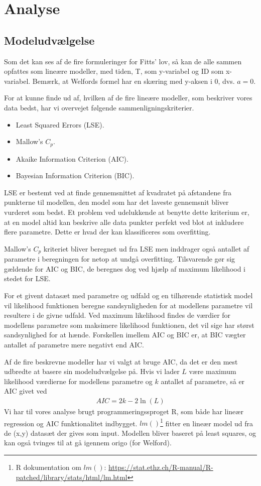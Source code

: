 \newpage
{}
\chapter*{Analyse}
\section*{Modeludvælgelse}
Som det kan ses af de fire formuleringer for Fitts' lov, så kan de alle sammen opfattes som lineære modeller, med tiden, T, som y-variabel og ID som x-variabel. Bemærk, at Welfords formel har en skæring med y-aksen i 0, dvs. $a=0$. 

For at kunne finde ud af, hvilken af de fire lineære modeller, som beskriver vores data bedst, har vi overvejet følgende sammenligningskriterier.

\begin{itemize}
\item{Least Squared Errors (LSE).}
\item{Mallow's $C_p$.}
\item{Akaike Information Criterion (AIC).}
\item{Bayesian Information Criterion (BIC).}
\end{itemize}

LSE er bestemt ved at finde gennemsnittet af kvadratet på afstandene fra punkterne til modellen, den model som har det laveste gennemsnit bliver vurderet som bedst. Et problem ved udelukkende at benytte dette kriterium er, at en model altid kan beskrive alle data punkter perfekt ved blot at inkludere flere parametre. Dette er hvad der kan klassificeres som overfitting.

Mallow's $C_p$ kriteriet bliver beregnet ud fra LSE men inddrager også antallet af parametre i beregningen for netop at undgå overfitting. Tilsvarende gør sig gældende for AIC og BIC, de beregnes dog ved hjælp af maximum likelihood i stedet for LSE.

For et givent datasæt med parametre og udfald og en tilhørende statistisk model vil likelihood funktionen beregne sandsynligheden for at modellens parametre vil resultere i de givne udfald. Ved maximum likelihood findes de værdier for modellens parametre som maksimere likelihood funktionen, det vil sige har størst sandsynlighed for at hænde. Forskellen imellem AIC og BIC er, at BIC vægter antallet af parametre mere negativt end AIC.

Af de fire beskrevne modeller har vi valgt at bruge AIC, da det er den mest udbredte at basere sin modeludvælgelse på. Hvis vi lader $L$ være maximum likelihood værdierne for modellens parametre og $k$ antallet af parametre, så er AIC givet ved
\begin{align}
AIC = 2k - 2\ln(L)
\end{align}
Vi har til vores analyse brugt programmeringssproget R, som både har lineær regression og AIC funktionalitet indbygget. $lm()$\footnote{R dokumentation om $lm()$: \url{https://stat.ethz.ch/R-manual/R-patched/library/stats/html/lm.html}} fitter en lineær model ud fra de (x,y) datasæt der gives som input. Modellen bliver baseret på least squares, og kan også tvinges til at gå igennem origo (for Welford).

